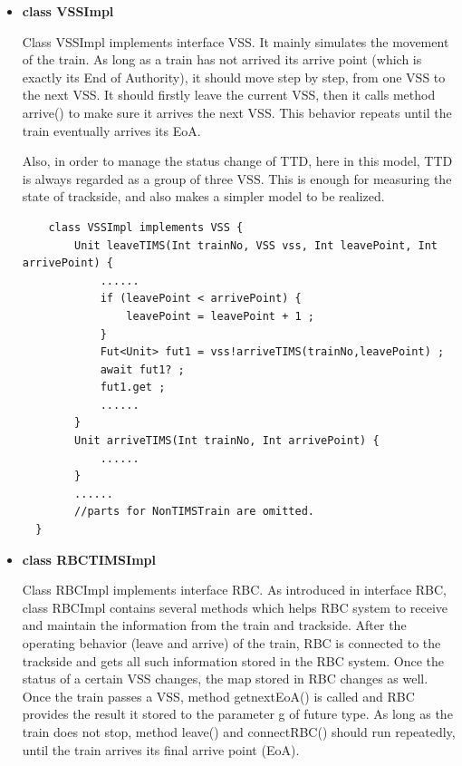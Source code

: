\documentclass[article,dr=phil,type=msc,colorback,accentcolor=tud9c]{tudthesis}
\begin{document}
  \begin{itemize}
  \item \textbf{class VSSImpl}
  
  Class VSSImpl implements interface VSS. It mainly simulates the movement of the train. As long as a train has not arrived its arrive point (which is exactly its End of Authority), it should move step by step, from one VSS to the next VSS. It should firstly leave the current VSS, then it calls method arrive() to make sure it arrives the next VSS. This behavior repeats until the train eventually arrives its EoA.
  
  Also, in order to manage the status change of TTD, here in this model, TTD is always regarded as a group of three VSS. This is enough for measuring the state of trackside, and also makes a simpler model to be realized.  
  
  \begin{lstlisting}
	class VSSImpl implements VSS {
		Unit leaveTIMS(Int trainNo, VSS vss, Int leavePoint, Int arrivePoint) {
			......
			if (leavePoint < arrivePoint) {
				leavePoint = leavePoint + 1 ;
			}
			Fut<Unit> fut1 = vss!arriveTIMS(trainNo,leavePoint) ;
			await fut1? ;
			fut1.get ;
			......
		}
		Unit arriveTIMS(Int trainNo, Int arrivePoint) {
			......
		}
		......
		//parts for NonTIMSTrain are omitted.
  }\end{lstlisting}

  \item \textbf{class RBCTIMSImpl}
  
  Class RBCImpl implements interface RBC. As introduced in interface RBC, class RBCImpl contains several methods which helps RBC system to receive and maintain the information from the train and trackside. After the operating behavior (leave and arrive) of the train, RBC is connected to the trackside and gets all such information stored in the RBC system. Once the status of a certain VSS changes, the map stored in RBC changes as well. Once the train passes a VSS, method getnextEoA() is called and RBC provides the result it stored to the parameter g of future type. As long as the train does not stop, method leave() and connectRBC() should run repeatedly, until the train arrives its final arrive point (EoA).
  

\end{itemize}
\end{document}

